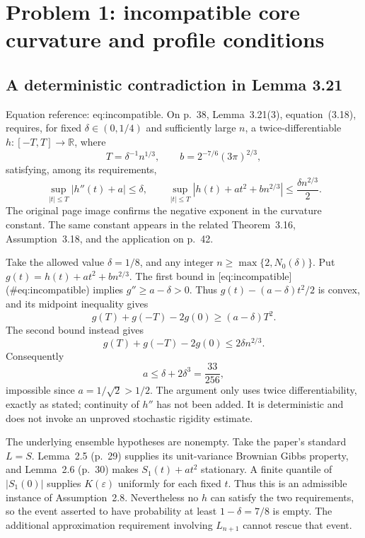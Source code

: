 \documentclass[10pt]{article}
\begin{document}
\section*{Problem 1: incompatible core curvature and profile conditions}
\subsection*{A deterministic contradiction in Lemma 3.21}
Equation reference: eq:incompatible. On p. 38, Lemma 3.21(3), equation (3.18), requires, for fixed \(\delta\in(0,1/4)\) and sufficiently large \(n\), a twice-differentiable \(h:[-T,T]\to\mathbb R\), where \[T=\delta^{-1}n^{1/3},\qquad b=2^{-7/6}(3\pi)^{2/3},\] satisfying, among its requirements, \[
 \sup_{|t|\le T}|h''(t)+a|\le\delta,\qquad
 \sup_{|t|\le T}|h(t)+at^2+bn^{2/3}|
       \le\frac{\delta n^{2/3}}2.\] The original page image confirms the negative exponent in the curvature constant. The same constant appears in the related Theorem 3.16, Assumption 3.18, and the application on p. 42.\par
Take the allowed value \(\delta=1/8\), and any integer \(n\ge\max\{2,N_0(\delta)\}\). Put \(g(t)=h(t)+at^2+bn^{2/3}\). The first bound in [eq:incompatible] (\#eq:incompatible) implies \(g''\ge a-\delta>0\). Thus \(g(t)-(a-\delta)t^2/2\) is convex, and its midpoint inequality gives \[g(T)+g(-T)-2g(0)\ge(a-\delta)T^2.\] The second bound instead gives \[g(T)+g(-T)-2g(0)\le2\delta n^{2/3}.\] Consequently \[a\le\delta+2\delta^3=\frac{33}{256},\] impossible since \(a=1/\sqrt2>1/2\). The argument only uses twice differentiability, exactly as stated; continuity of \(h''\) has not been added. It is deterministic and does not invoke an unproved stochastic rigidity estimate.\par
The underlying ensemble hypotheses are nonempty. Take the paper’s standard \(L=S\). Lemma 2.5 (p. 29) supplies its unit-variance Brownian Gibbs property, and Lemma 2.6 (p. 30) makes \(S_1(t)+at^2\) stationary. A finite quantile of \(|S_1(0)|\) supplies \(K(\varepsilon)\) uniformly for each fixed \(t\). Thus this is an admissible instance of Assumption 2.8. Nevertheless no \(h\) can satisfy the two requirements, so the event asserted to have probability at least \(1-\delta=7/8\) is empty. The additional approximation requirement involving \(L_{n+1}\) cannot rescue that event.\par
\end{document}
